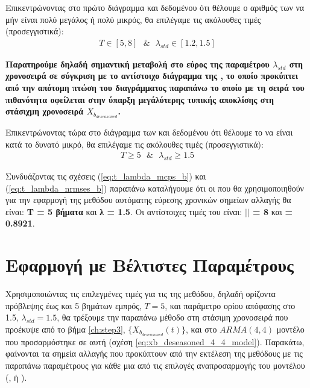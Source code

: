 \par Επικεντρώνοντας στο πρώτο διάγραμμα και δεδομένου ότι θέλουμε ο αριθμός των  να μήν είναι πολύ μεγάλος ή πολύ μικρός, θα επιλέγαμε τις ακόλουθες τιμές (προσεγγιστικά):
\begin{align}
    T \in [5,8] \ \ \ \& \ \ \ \lambda_{std} \in [1.2, 1.5]
    \label{eq:t_lambda_mcps_b}
\end{align}

\textbf{Παρατηρούμε δηλαδή σημαντική μεταβολή στο εύρος της παραμέτρου $\lambda_{std}$ στη χρονοσειρά  σε σύγκριση με το αντίστοιχο διάγραμμα της , το οποίο προκύπτει από την απότομη πτώση του διαγράμματος παραπάνω το οποίο με τη σειρά του πιθανότητα οφείλεται στην ύπαρξη μεγάλύτερης τυπικής αποκλίσης στη στάσιχμη χρονοσειρά $X_{b_{deseasoned}}$.}

\par Επικεντρώνοντας τώρα στο διάγραμμα των  και δεδομένου ότι θέλουμε το  να είναι κατά το δυνατό μικρό, θα επιλέγαμε τις ακόλουθες τιμές (προσεγγιστικά):
\begin{align}
    T \geq 5 \ \ \ \& \ \ \ \lambda_{std} \geq 1.5
    \label{eq:t_lambda_nrmses_b}
\end{align}

\par Συνδυάζοντας τις σχέσεις (\ref{eq:t_lambda_mcps_b}) και (\ref{eq:t_lambda_nrmses_b}) παραπάνω καταλήγουμε ότι οι  που θα χρησιμοποιηθούν για την εφαρμογή της μεθόδου αυτόματης εύρεσης χρονικών σημείων αλλαγής θα είναι:
\textbf{T = 5 βήματα} και \textbf{λ\textsubscript{} = 1.5}. Οι αντίστοιχες τιμές του  είναι: \textbf{$\vert$$\vert$ = 8 } και \textbf{ = 0.8921}.


\section{Εφαρμογή με Βέλτιστες Παραμέτρους}

Χρησιμοποιώντας τις επιλεγμένες τιμές για τις  της μεθόδου, δηλαδή ορίζοντα πρόβλεψης έως και 5 βημάτων εμπρός, $T=5$, και παράμετρο ορίου απόφασης στο 1.5, $\lambda_{std}=1.5$, θα τρέξουμε την παραπάνω μέθοδο στη στάσιμη χρονοσειρά που προέκυψε από το βήμα \ref{ch:step3}, $\{X_{b_{deseasoned}}(t)\}$, και στο $ARMA(4,4)$ μοντέλο που προσαρμόστηκε σε αυτή (σχέση \ref{eq:xb_deseasoned_4_4_model}). Παρακάτω, φαίνονται τα σημεία αλλαγής που προκύπτουν από την εκτέλεση της μεθόδους με τις παραπάνω παραμέτρους για κάθε μια από τις επιλογές αναπροσαρμογής του μοντέλου (,  ή ).

